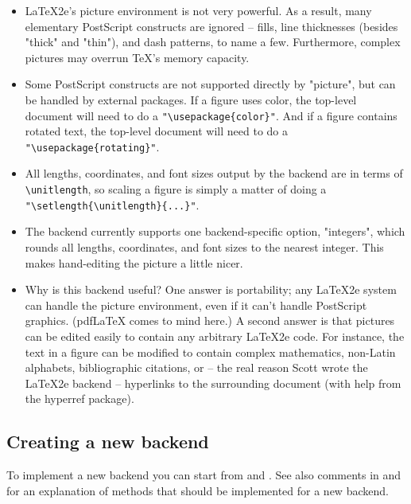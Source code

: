 \documentclass[english,a4paper]{article}
\begin{document}
    \begin{itemize}
   \item LaTeX2e's picture environment is not very powerful.  As a result, many
     elementary PostScript constructs are ignored -- fills, line
     thicknesses (besides "thick" and "thin"), and dash patterns, to name a
     few.  Furthermore, complex pictures may overrun TeX's memory capacity.

   \item Some PostScript constructs are not supported directly by "picture",
     but can be handled by external packages.  If a figure uses color, the
     top-level document will need to do a \verb+"\usepackage{color}"+.  And if a
     figure contains rotated text, the top-level document will need to do a
     \verb+"\usepackage{rotating}"+.

   \item All lengths, coordinates, and font sizes output by the backend are in
     terms of \verb+\unitlength+, so scaling a figure is simply a matter of doing
     a \verb+"\setlength{\unitlength}{...}"+.

   \item The backend currently supports one backend-specific option,
     "integers", which rounds all lengths, coordinates, and font sizes to
     the nearest integer.  This makes hand-editing the picture a little
     nicer.

   \item Why is this backend useful?  One answer is portability; any LaTeX2e
     system can handle the picture environment, even if it can't handle
     PostScript graphics.  (pdfLaTeX comes to mind here.)  A second answer
     is that pictures can be edited easily to contain any arbitrary LaTeX2e
     code.  For instance, the text in a figure can be modified to contain
     complex mathematics, non-Latin alphabets, bibliographic citations, or
     -- the real reason Scott wrote the LaTeX2e backend -- hyperlinks to the
     surrounding document (with help from the hyperref package).
   \end{itemize}


  \subsection{Creating a new backend}

    To implement a new backend you can start from  and
    . See also comments in  and
     for an explanation of methods that should be implemented
    for a new backend.
\end{document}
